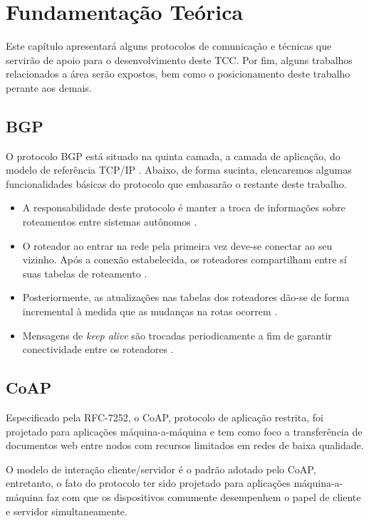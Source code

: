 \chapter{\label{chap:chap2} Fundamentação Teórica}

Este capítulo apresentará alguns protocolos de comunicação e técnicas que servirão de apoio para o desenvolvimento deste TCC. 
Por fim, alguns trabalhos relacionados a área serão expostos, bem como o posicionamento deste trabalho perante aos demais.

\section{BGP}


O protocolo BGP está situado na quinta camada, a camada de aplicação, do modelo de referência TCP/IP \cite{tanenbaum2011redes}.
Abaixo, de forma sucinta, elencaremos algumas funcionalidades básicas do protocolo que embasarão o restante deste trabalho.

\begin{itemize}
    \item A responsabilidade deste protocolo é manter a troca de informações sobre roteamentos entre sistemas autônomos \cite{Rekhter:1995}.
    \item O roteador ao entrar na rede pela primeira vez deve-se conectar ao seu vizinho. Após a conexão estabelecida, os roteadores compartilham entre sí suas tabelas de roteamento \cite{Rekhter:1995}.
    \item Posteriormente, as atualizações nas tabelas dos roteadores dão-se de forma incremental à medida que as mudanças na rotas ocorrem \cite{Rekhter:1995}.
    \item Mensagens de \textit{keep alive} são trocadas periodicamente a fim de garantir conectividade entre os roteadores \cite{Rekhter:1995}.
\end{itemize}

\section{CoAP}

Especificado pela RFC-7252, o CoAP, protocolo de aplicação restrita, foi projetado para aplicações máquina-a-máquina
e tem como foco a transferência de documentos web entre nodos com recursos limitados em redes de baixa qualidade\cite{rfc7252}.

O modelo de interação cliente/servidor é o padrão adotado pelo CoAP, entretanto,
o fato do protocolo ter sido projetado para aplicações máquina-a-máquina faz com que os dispositivos comumente desempenhem o papel de cliente e servidor simultaneamente.


